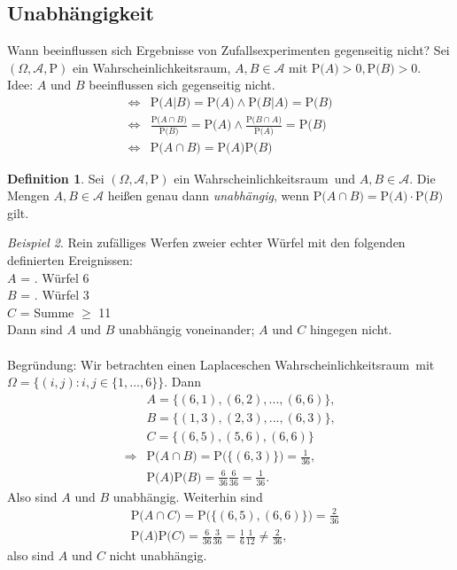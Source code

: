 \documentclass[a4paper,12pt,fleqn]{scrartcl}
\newcommand{\m}[1]{\mathcal{ #1 }}
\newcommand{\p}[1]{\text{P(} #1 \text{)}}
\newcommand{\ZE}{Zufallsexperiment}
\newcommand{\WR}{Wahrscheinlichkeitsraum}
\theoremstyle{definition}
\newtheorem{definition}{Definition}[section]
\theoremstyle{plain}
\theoremstyle{remark}
\newtheorem{beispiel}[definition]{Beispiel}
\begin{document}
\subsection{Unabhängigkeit}
Wann beeinflussen sich Ergebnisse von \ZE en gegenseitig nicht? Sei $( \Omega , \m{A} , \text{P})$ ein \WR, $A,B \in \m{A} $ mit $\p{A} > 0, \p{B} > 0$. \\
Idee: $A$ und $B$ beeinflussen sich gegenseitig nicht.
\begin{align*}
\Leftrightarrow & \p{A|B} = \p{A} \land \p{B|A} = \p{B} \\
\Leftrightarrow & \frac{\p{A \cap B}}{\p{B}} = \p{A} \land \frac{\p{B \cap A}}{\p{A}} = \p{B} \\
\Leftrightarrow & \p{A \cap B} = \p{A}\p{B}
\end{align*}
\begin{definition}
Sei $( \Omega , \m{A} , \text{P})$ ein \WR \, und $A,B \in \m{A}$. Die Mengen $ A,B \in \m{A} $ heißen genau dann \emph{unabhängig}, wenn $ \p{A \cap B} = \p{A} \cdot \p{B}$ gilt.
\end{definition}
\begin{beispiel}
Rein zufälliges Werfen zweier echter Würfel mit den folgenden definierten Ereignissen:\\
$A$ = . Würfel 6\grqq \\
$B$ = . Würfel 3\grqq \\
$C$ = \glqq Summe $\geq$ 11 \grqq\\
Dann sind $A$ und $B$ unabhängig voneinander; $A$ und $C$ hingegen nicht.
\\ \\
Begründung: Wir betrachten einen Laplaceschen \WR \, mit $ \Omega = \{ (i,j) : i,j \in \{ 1,...,6 \} \}$. Dann 
\begin{align*}
& A = \{ (6,1),(6,2),...,(6,6) \}, \\
& B = \{ (1,3),(2,3),...,(6,3) \}, \\
& C = \{ (6,5),(5,6),(6,6) \} \\
\Rightarrow & \p{A \cap B} = \p{\{ (6,3) \}} = \frac{1}{36}, \\
& \p{A}\p{B} = \frac{6}{36} \frac{6}{36} = \frac{1}{36}.
\end{align*}
Also sind $A$ und $B$ unabhängig. Weiterhin sind
\begin{align*}
& \p{A \cap C} = \p{\{ (6,5),(6,6) \}} = \frac{2}{36} \\
& \p{A}\p{C} = \frac{6}{36} \frac{3}{36} = \frac{1}{6} \frac{1}{12} \neq \frac{2}{36},
\end{align*}
also sind $A$ und $C$ nicht unabhängig.
\end{beispiel}
\end{document}
